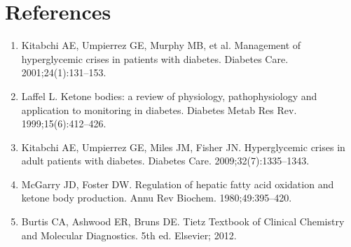 \section*{References}
\begin{enumerate}
  \item Kitabchi AE, Umpierrez GE, Murphy MB, et al. Management of hyperglycemic crises in patients with diabetes. Diabetes Care. 2001;24(1):131--153.
  \item Laffel L. Ketone bodies: a review of physiology, pathophysiology and application to monitoring in diabetes. Diabetes Metab Res Rev. 1999;15(6):412--426.
  \item Kitabchi AE, Umpierrez GE, Miles JM, Fisher JN. Hyperglycemic crises in adult patients with diabetes. Diabetes Care. 2009;32(7):1335--1343.
  \item McGarry JD, Foster DW. Regulation of hepatic fatty acid oxidation and ketone body production. Annu Rev Biochem. 1980;49:395--420.
  \item Burtis CA, Ashwood ER, Bruns DE. Tietz Textbook of Clinical Chemistry and Molecular Diagnostics. 5th ed. Elsevier; 2012.
\end{enumerate}
\clearpage
